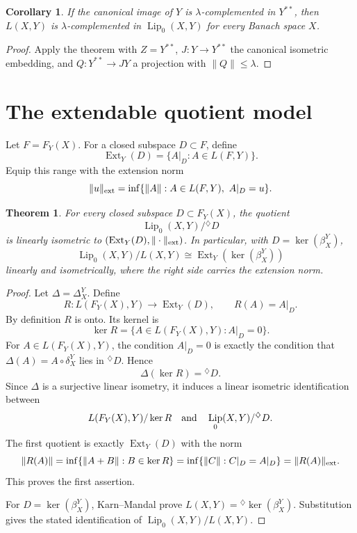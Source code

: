 \documentclass[11pt]{article}
\newtheorem{theorem}{Theorem}
\newtheorem{corollary}{Corollary}
\DeclareMathOperator{\Lip}{Lip}
\DeclareMathOperator{\Ext}{Ext}
\begin{document}
\begin{corollary}
If the canonical image of \(Y\) is \(\lambda\)-complemented in \(Y^{**}\),
then \(L(X,Y)\) is \(\lambda\)-complemented in \(\Lip_0(X,Y)\) for every
Banach space \(X\).
\end{corollary}

\begin{proof}
Apply the theorem with \(Z=Y^{**}\), \(J:Y\to Y^{**}\) the canonical
isometric embedding, and \(Q:Y^{**}\to JY\) a projection with
\(\|Q\|\leq\lambda\).
\end{proof}

\section*{The extendable quotient model}

Let \(F=F_Y(X)\). For a closed subspace \(D\subset F\), define
\[
  \Ext_Y(D)
  =
  \{A|_D:A\in L(F,Y)\}.
\]
Equip this range with the extension norm
\[
  \|u\|_{\rm ext}
  =
  \inf\{\|A\|: A\in L(F,Y),\ A|_D=u\}.
\]

\begin{theorem}
For every closed subspace \(D\subset F_Y(X)\), the quotient
\[
  \Lip_0(X,Y)/{}^{\diamondsuit}D
\]
is linearly isometric to \((\Ext_Y(D),\|\cdot\|_{\rm ext})\). In particular,
with \(D=\ker(\beta_X^Y)\),
\[
  \Lip_0(X,Y)/L(X,Y)
  \cong
  \Ext_Y(\ker(\beta_X^Y))
\]
linearly and isometrically, where the right side carries the extension norm.
\end{theorem}

\begin{proof}
Let \(\Delta=\Delta_X^Y\). Define
\[
  R:L(F_Y(X),Y)\longrightarrow \Ext_Y(D),\qquad R(A)=A|_D.
\]
By definition \(R\) is onto. Its kernel is
\[
  \ker R=\{A\in L(F_Y(X),Y):A|_D=0\}.
\]
For \(A\in L(F_Y(X),Y)\), the condition \(A|_D=0\) is exactly the condition
that \(\Delta(A)=A\circ\delta_X^Y\) lies in \({}^{\diamondsuit}D\). Hence
\[
  \Delta(\ker R)={}^{\diamondsuit}D.
\]
Since \(\Delta\) is a surjective linear isometry, it induces a linear
isometric identification between
\[
  L(F_Y(X),Y)/\ker R
  \quad\hbox{and}\quad
  \Lip_0(X,Y)/{}^{\diamondsuit}D.
\]
The first quotient is exactly \(\Ext_Y(D)\) with the norm
\[
  \|R(A)\|
  =
  \inf\{\|A+B\|:B\in\ker R\}
  =
  \inf\{\|C\|:C|_D=A|_D\}
  =
  \|R(A)\|_{\rm ext}.
\]
This proves the first assertion.

For \(D=\ker(\beta_X^Y)\), Karn--Mandal prove
\(L(X,Y)={}^{\diamondsuit}\ker(\beta_X^Y)\). Substitution gives the stated
identification of \(\Lip_0(X,Y)/L(X,Y)\).
\end{proof}
\end{document}

